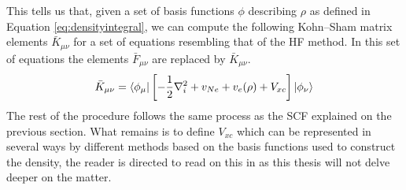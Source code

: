 \documentclass[../master_thesis.tex]{subfiles}
\begin{document}
This tells us that, given a set of basis functions $\phi$ describing
$\rho$ as defined in Equation \ref{eq:densityintegral}, we can compute the following
Kohn--Sham  matrix elements $\bar{K}_{\mu\nu}$ for a set of equations resembling that of the \ac{HF}
method. In this set of equations the elements $\bar{F}_{\mu\nu}$ are replaced by $\bar{K}_{\mu\nu}$.
\begin{equation}
  \bar{K}_{\mu\nu} = \braket{\phi_\mu|\left[- \frac{1}{2}\nabla^2_i + v_{Ne} + v_e(\rho) + V_{xc}\right]|\phi_\nu}
\end{equation}
The rest of the procedure follows the same process as the \ac{SCF} explained on
the previous section.
What remains is to define $V_{xc}$ which can be represented in several ways by different methods
based on the basis functions used to construct the density, the reader is directed to
read on this in \cite{Cramer:2004} as this thesis will not delve deeper on the
matter.


\biblio
\end{document}
